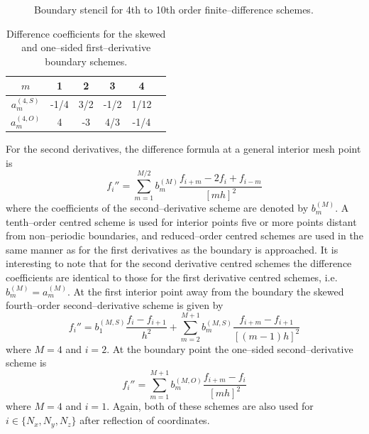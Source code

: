 \documentclass[dvips]{article}
\begin{document}
\begin{figure}[htbp]
\begin{center}
\caption{Boundary stencil for 4th to 10th order finite--difference schemes.}
\end{center}
\end{figure}

\begin{table}[htbp]
\begin{center}
\begin{tabular}{|c|c|c|c|c|c|} \hline
$m$              &  1   &  2     &  3   &  4    \\ \hline
$a_{m}^{(4,S)}$  & -1/4 &  3/2   & -1/2 &  1/12 \\
$a_{m}^{(4,O)}$  &  4   & -3     &  4/3 & -1/4  \\ \hline
\end{tabular}
\caption{Difference coefficients for the skewed and one--sided
first--derivative boundary schemes.}
\end{center}
\end{table}

\noindent
For the second derivatives, the difference formula at a general interior
mesh point is 
\begin{equation}
f_{i}'' = \sum_{m=1}^{M/2} b_{m}^{(M)}\frac{f_{i+m} - 2f_{i} + f_{i-m}}
{[mh]^{2}}
\end{equation}
where the coefficients of the second--derivative scheme are denoted by 
$b_{m}^{(M)}$.  A tenth--order centred scheme is
used for interior points five or more points distant from non--periodic
boundaries, and reduced--order centred schemes are used in the same
manner as for the first derivatives as the boundary is approached.
It is interesting to note that for the second derivative centred schemes the
difference coefficients are identical to those for the first derivative
centred schemes, i.e.  $b_{m}^{(M)} = a_{m}^{(M)}$.
At the first interior point away from the boundary the skewed fourth--order
second--derivative scheme is given by
\begin{equation}
f_{i}'' = b_{1}^{(M,S)}\frac{f_{i} - f_{i+1}}{h^{2}}
        + \sum_{m=2}^{M+1} b_{m}^{(M,S)}\frac{f_{i+m} - f_{i+1}}{[(m-1)h]^{2}}
\end{equation}
where $M=4$ and $i=2$.
At the boundary point the one--sided second--derivative scheme is
\begin{equation}
f_{i}'' = \sum_{m=1}^{M+1} b_{m}^{(M,O)}\frac{f_{i+m} - f_{i}}{[mh]^{2}}
\end{equation}
where $M=4$ and $i=1$.  Again, both of these schemes are also used for
$i\in\{N_{x},N_{y},N_{z}\}$ after reflection of coordinates.
\end{document}

